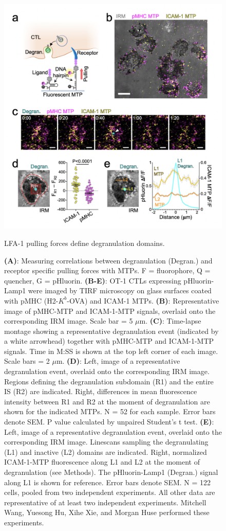 \begin{figure}[htbp]
	\centering
	\includegraphics[width=0.8\columnwidth]{../figures/chapter3/fig3mtp.png}
	\caption{LFA-1 pulling forces define degranulation domains.}
	\caption*{\textbf{(A)}: Measuring correlations between degranulation (Degran.) and receptor specific pulling forces with MTPs. F = fluorophore, Q = quencher, G = pHluorin. \textbf{(B-E)}: OT-1 CTLs expressing pHluorin-Lamp1 were imaged by TIRF microscopy on glass surfaces coated with pMHC (H2-$K^{b}$-OVA) and ICAM-1 MTPs. \textbf{(B)}: Representative image of pMHC-MTP and ICAM-1-MTP signals, overlaid onto the corresponding IRM image. Scale bar = 5 $\mu$m. \textbf{(C)}: Time-lapse montage showing a representative degranulation event (indicated by a white arrowhead) together with pMHC-MTP and ICAM-1-MTP signals. Time in M:SS is shown at the top left corner of each image. Scale bars = 2 $\mu$m. \textbf{(D)}: Left, image of a representative degranulation event, overlaid onto the corresponding IRM image. Regions defining the degranulation subdomain (R1) and the entire IS (R2) are indicated. Right, differences in mean fluorescence intensity between R1 and R2 at the moment of degranulation are shown for the indicated MTPs. N = 52 for each sample. Error bars denote SEM. P value calculated by unpaired Student’s t test. \textbf{(E)}: Left, image of a representative degranulation event, overlaid onto the corresponding IRM image. Linescans sampling the degranulating (L1) and inactive (L2) domains are indicated. Right, normalized ICAM-1-MTP fluorescence along L1 and L2 at the moment of degranulation (see Methods). The pHluorin-Lamp1 (Degran.) signal along L1 is shown for reference. Error bars denote SEM. N = 122 cells, pooled from two independent experiments. All other data are representative of at least two independent experiments. Mitchell Wang, Yuesong Hu, Xihe Xie, and Morgan Huse performed these experiments.}
	\label{fig:fig3mtp}
\end{figure} 

